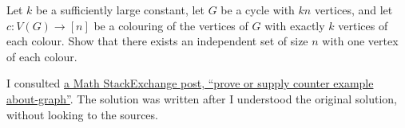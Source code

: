 \documentclass[10pt, a4paper]{article}
\begin{document}
\newpage
\begin{prob}\label{prob:5}
	Let $k$ be a sufficiently large constant, let $G$ be a cycle with $kn$ vertices, and let $c: V(G) \to [n]$ be a colouring of the vertices of $G$ with exactly $k$ vertices of each colour. Show that there exists an independent set of size $n$ with one vertex of each colour.
\end{prob}

\begin{rem}
	I consulted \href{https://math.stackexchange.com/questions/788705/prove-or-supply-counter-example-about-graph}{a Math StackExchange post, ``prove or supply counter example about-graph''}. The solution was written after I understood the original solution, without looking to the sources.
\end{rem}
\end{document}

